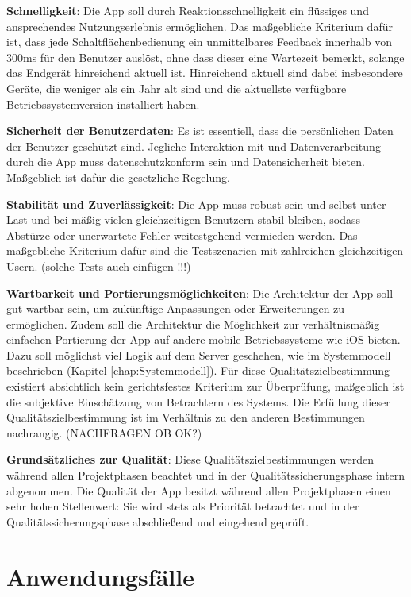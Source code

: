 \documentclass[oneside, ngerman]{sdqtechreport}
\begin{document}
\textbf{Schnelligkeit}: Die App soll durch Reaktionsschnelligkeit ein flüssiges und ansprechendes Nutzungserlebnis ermöglichen. Das maßgebliche Kriterium dafür ist, dass jede Schaltflächenbedienung ein unmittelbares Feedback innerhalb von 300ms für den Benutzer auslöst, ohne dass dieser eine Wartezeit bemerkt, solange das Endgerät hinreichend aktuell ist. Hinreichend aktuell sind dabei insbesondere Geräte, die weniger als ein Jahr alt sind und die aktuellste verfügbare Betriebssystemversion installiert haben.

\textbf{Sicherheit der Benutzerdaten}: Es ist essentiell, dass die persönlichen Daten der Benutzer geschützt sind. Jegliche Interaktion mit und Datenverarbeitung durch die App muss datenschutzkonform sein und Datensicherheit bieten. Maßgeblich ist dafür die gesetzliche Regelung.

\textbf{Stabilität und Zuverlässigkeit}: Die App muss robust sein und selbst unter Last und bei mäßig vielen gleichzeitigen Benutzern stabil bleiben, sodass Abstürze oder unerwartete Fehler weitestgehend vermieden werden. Das maßgebliche Kriterium dafür sind die Testszenarien mit zahlreichen gleichzeitigen Usern. (solche Tests auch einfügen !!!)

\textbf{Wartbarkeit und Portierungsmöglichkeiten}: Die Architektur der App soll gut wartbar sein, um zukünftige Anpassungen oder Erweiterungen zu ermöglichen. Zudem soll die Architektur die Möglichkeit zur verhältnismäßig einfachen Portierung der App auf andere mobile Betriebssysteme wie iOS bieten. Dazu soll möglichst viel Logik auf dem Server geschehen, wie im Systemmodell beschrieben (Kapitel \ref{chap:Systemmodell}). Für diese Qualitätszielbestimmung existiert absichtlich kein gerichtsfestes Kriterium zur Überprüfung, maßgeblich ist die subjektive Einschätzung von Betrachtern des Systems. Die Erfüllung dieser Qualitätszielbestimmung ist im Verhältnis zu den anderen Bestimmungen nachrangig. (NACHFRAGEN OB OK?)

\textbf{Grundsätzliches zur Qualität}: Diese Qualitätszielbestimmungen werden während allen Projektphasen beachtet und in der Qualitätssicherungsphase intern abgenommen. Die Qualität der App besitzt während allen Projektphasen einen sehr hohen Stellenwert: Sie wird stets als Priorität betrachtet und in der Qualitätssicherungsphase abschließend und eingehend geprüft.



\chapter{Anwendungsfälle}
\label{chap:Anwendungsfälle}
\end{document}
